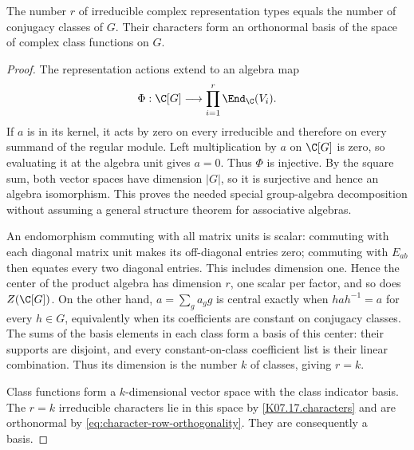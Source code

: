 \begin{theorem}\label{thm:character-completeness}
The number $r$ of irreducible complex representation types equals the
number of conjugacy classes of $G$. Their characters form an orthonormal
basis of the space of complex class functions on $G$.
\end{theorem}
\begin{proof}
The representation actions extend to an algebra map
\[
 \Phi:\C[G]\longrightarrow\prod_{i=1}^r\End_\C(V_i).
\]
If $a$ is in its kernel, it acts by zero on every irreducible and
therefore on every summand of the regular module. Left multiplication
by $a$ on $\C[G]$ is zero, so evaluating it at the algebra unit gives
$a=0$. Thus $\Phi$ is injective. By the square sum, both vector
spaces have dimension $|G|$, so it is surjective and hence an algebra
isomorphism. This proves the needed special group-algebra decomposition
without assuming a general structure theorem for associative algebras.

An endomorphism commuting with all matrix units is scalar: commuting
with each diagonal matrix unit makes its off-diagonal entries zero;
commuting with $E_{ab}$ then equates every two diagonal entries.
This includes dimension one. Hence the center of the product algebra
has dimension $r$, one scalar per factor, and so does $Z(\C[G])$.
On the other hand, $a=\sum_g a_g g$ is central exactly when
$hah^{-1}=a$ for every $h\in G$, equivalently when its coefficients
are constant on conjugacy classes. The sums of the basis elements in
each class form a basis of this center: their supports are disjoint,
and every constant-on-class coefficient list is their linear combination.
Thus its dimension is the number $k$ of classes, giving $r=k$.

Class functions form a $k$-dimensional vector space with the class
indicator basis. The $r=k$ irreducible characters lie in this space by
\ref{K07.17.characters} and are orthonormal by
\eqref{eq:character-row-orthogonality}. They are consequently a basis.
\end{proof}

